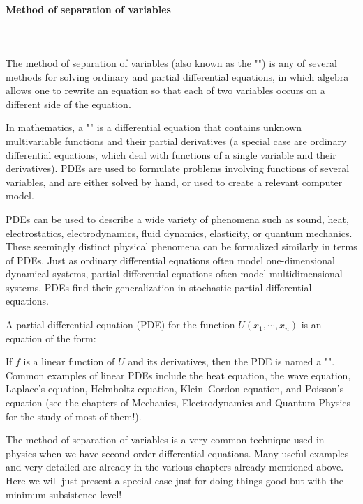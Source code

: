 	\pagebreak
	\paragraph{Method of separation of variables}\mbox{}\\\\
	The method of separation of variables (also known as the "") is any of several methods for solving ordinary and partial differential equations, in which algebra allows one to rewrite an equation so that each of two variables occurs on a different side of the equation.
	
	In mathematics, a "" is a differential equation that contains unknown multivariable functions and their partial derivatives (a special case are ordinary differential equations, which deal with functions of a single variable and their derivatives). PDEs are used to formulate problems involving functions of several variables, and are either solved by hand, or used to create a relevant computer model.
	
	PDEs can be used to describe a wide variety of phenomena such as sound, heat, electrostatics, electrodynamics, fluid dynamics, elasticity, or quantum mechanics. These seemingly distinct physical phenomena can be formalized similarly in terms of PDEs. Just as ordinary differential equations often model one-dimensional dynamical systems, partial differential equations often model multidimensional systems. PDEs find their generalization in stochastic partial differential equations.
	
	A partial differential equation (PDE) for the function $U(x_{1},\cdots ,x_{n})$ is an equation of the form:
	
	If $f$ is a linear function of $U$ and its derivatives, then the PDE is named a "". Common examples of linear PDEs include the heat equation, the wave equation, Laplace's equation, Helmholtz equation, Klein–Gordon equation, and Poisson's equation (see the chapters of Mechanics, Electrodynamics and Quantum Physics for the study of most of them!).
	
	The method of separation of variables is a very common technique used in physics when we have second-order differential equations. Many useful examples and very detailed are already in the various chapters already mentioned above. Here we will just present a special case just for doing things good but with the minimum subsistence level!
	
